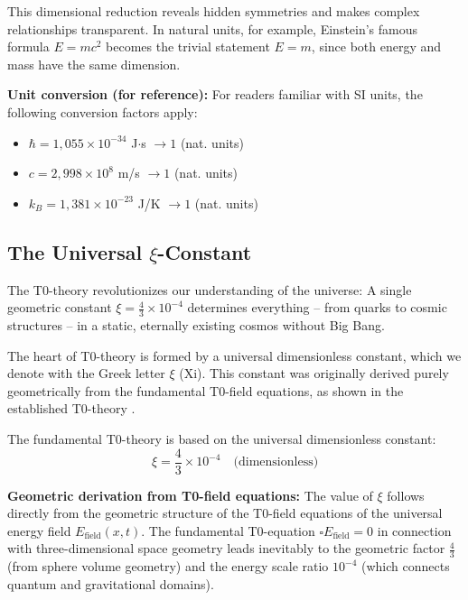 \documentclass[12pt,a4paper]{article}
\begin{document}
	This dimensional reduction reveals hidden symmetries and makes complex relationships transparent. In natural units, for example, Einstein's famous formula $E = mc^2$ becomes the trivial statement $E = m$, since both energy and mass have the same dimension.
	
	\textbf{Unit conversion (for reference):}
	For readers familiar with SI units, the following conversion factors apply:
	\begin{itemize}
		\item $\hbar = 1{,}055 \times 10^{-34}$ J$\cdot$s $\rightarrow 1$ (nat. units)
		\item $c = 2{,}998 \times 10^8$ m/s $\rightarrow 1$ (nat. units)  
		\item $k_B = 1{,}381 \times 10^{-23}$ J/K $\rightarrow 1$ (nat. units)
	\end{itemize}
	
	\subsection{The Universal $\xi$-Constant}
	
	\begin{revolutionary}
		The T0-theory revolutionizes our understanding of the universe: A single geometric constant $\xi = \frac{4}{3} \times 10^{-4}$ determines everything -- from quarks to cosmic structures -- in a static, eternally existing cosmos without Big Bang.
	\end{revolutionary}
	
	The heart of T0-theory is formed by a universal dimensionless constant, which we denote with the Greek letter $\xi$ (Xi). This constant was originally derived purely geometrically from the fundamental T0-field equations, as shown in the established T0-theory \cite{T0Theory}.
	
	The fundamental T0-theory is based on the universal dimensionless constant:
	\begin{equation}
		\xi = \frac{4}{3} \times 10^{-4} \quad \text{(dimensionless)}
	\end{equation}
	
	\textbf{Geometric derivation from T0-field equations:} The value of $\xi$ follows directly from the geometric structure of the T0-field equations of the universal energy field $E_{\text{field}}(x,t)$. The fundamental T0-equation $\square E_{\text{field}} = 0$ in connection with three-dimensional space geometry leads inevitably to the geometric factor $\frac{4}{3}$ (from sphere volume geometry) and the energy scale ratio $10^{-4}$ (which connects quantum and gravitational domains).
	
\end{document}
